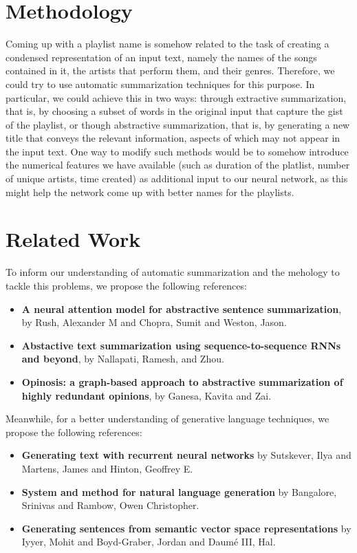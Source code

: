 \documentclass{article} %
\begin{document}
\section{Methodology}
\label{methods}
Coming up with a playlist name is somehow related to the task of creating a condensed representation of an input text, namely the names of the songs contained in it, the artists that perform them, and their genres.
Therefore, we could try to use automatic summarization techniques for this purpose. In particular, we could achieve this in two ways: through extractive summarization, that is, by choosing a subset of words in the original input that capture the gist of the playlist, or though abstractive summarization, that is, by generating a new title that conveys the relevant information, aspects of which may not appear in the input text.  
One way to modify such methods would be to somehow introduce the numerical features we have available (such as duration of the platlist, number of unique artists, time created) as additional input to our neural network, as this might help the network come up with better names for the playlists.

\section{Related Work}
\label{work}
To inform our understanding of automatic summarization and the mehology to tackle this problems, we propose the following references:
\begin{itemize}
	\item \textbf{A neural attention model for abstractive sentence summarization}\cite{rush2015neural}, by Rush, Alexander M and Chopra, Sumit and Weston, Jason.
	\item \textbf{Abstactive text summarization using sequence-to-sequence RNNs and beyond}\cite{nallapati2016abstractive}, by Nallapati, Ramesh, and Zhou.
	\item \textbf{Opinosis: a graph-based approach to abstractive summarization of highly redundant opinions}\cite{ganesan2010opinosis}, by Ganesa, Kavita and Zai. 
\end{itemize}

Meanwhile, for a better understanding of generative language techniques, we propose the following references: 
\begin{itemize}
    \item \textbf{Generating text with recurrent neural networks}\cite{sutskever2011generating} by Sutskever, Ilya and Martens, James and Hinton, Geoffrey E.	
    \item \textbf{System and method for natural language generation}\cite{bangalore2007system} by Bangalore, Srinivas and Rambow, Owen Christopher. 
    \item \textbf{Generating sentences from semantic vector space representations}\cite{iyyer2014generating} by Iyyer, Mohit and Boyd-Graber, Jordan and Daum{\'e} III, Hal. 
\end{itemize}
\end{document}
